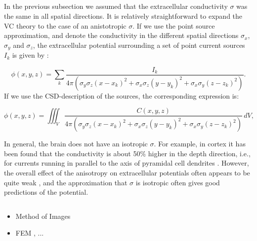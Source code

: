 \subsection{}
\label{sec:Anisotropic}
In the previous subsection we assumed that the extracellular conductivity $\sigma$ was the same in all spatial directions. It is relatively straightforward to expand the VC theory to the case of an anistotropic $\sigma$. If we use the point source approximation, and denote the conductivity in the different spatial directions $\sigma_x$, $\sigma_y$ and $\sigma_z$, the extracellular potential surrounding a set of point current sources $I_k$ is given by \citep{nicholson1975, Pettersen2012}:

\begin{equation}
\phi(x,y,z) = \sum_k \frac{I_k}{4\pi(\sigma_y\sigma_z (x-x_k)^2 + \sigma_x\sigma_z (y-y_k)^2 + \sigma_x\sigma_y (z-z_k)^2)}.
\label{eq:Panisos}
\end{equation}
If we use the CSD-description of the sources, the corresponding expression is:

\begin{equation}
\phi(x,y,z) = \iiint_V \frac{C(x,y,z)}{4\pi(\sigma_y\sigma_z (x-x_k)^2 + \sigma_x\sigma_z (y-y_k)^2 + \sigma_x\sigma_y (z-z_k)^2)} \, dV, 
\label{eq:Canisos}
\end{equation}

In general, the brain does not have an isotropic $\sigma$. For example, in cortex it has been found that the conductivity is about 50\% higher in the depth direction, i.e., for currents running in parallel to the axis of pyramidal cell dendrites \citep{Goto2010}. However, the overall effect of the anisotropy on extracellular potentials often appears to be quite weak \citep{Ness2015}, and the approximation that $\sigma$ is isotropic often gives good predictions of the potential.


\subsection{}
\label{sec:nonhomo}

\begin{itemize}
\item Method of Images \citep{Ness2015}
\item FEM \citep{Ness2015}, ...
\end{itemize}


